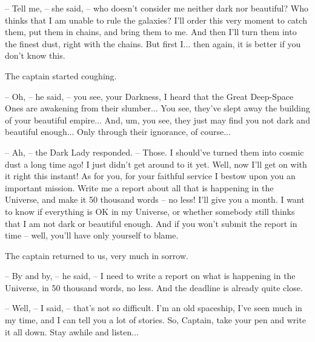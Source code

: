 \documentclass[ebook,oneside,final,openright]{memoir}
\begin{document}
– Tell me, – she said, – who doesn’t consider me neither dark nor beautiful? Who thinks that I am unable to rule the galaxies? I’ll order this very moment to catch them, put them in chains, and bring them to me. And then I’ll turn them into the finest dust, right with the chains. But first I... then again, it is better if you don’t know this.\par
The captain started coughing.\par
– Oh, – he said, – you see, your Darkness, I heard that the Great Deep-Space Ones are awakening from their slumber... You see, they’ve slept away the building of your beautiful empire... And, um, you see, they just may find you not dark and beautiful enough... Only through their ignorance, of course...\par
– Ah, – the Dark Lady responded. – Those. I should’ve turned them into cosmic dust a long time ago! I just didn’t get around to it yet. Well, now I’ll get on with it right this instant! As for you, for your faithful service I bestow upon you an important mission. Write me a report about all that is happening in the Universe, and make it 50 thousand words – no less! I’ll give you a month. I want to know if everything is OK in my Universe, or whether somebody still thinks that I am not dark or beautiful enough. And if you won’t submit the report in time – well, you’ll have only yourself to blame.\par
\par
The captain returned to us, very much in sorrow.\par
– By and by, – he said, – I need to write a report on what is happening in the Universe, in 50 thousand words, no less. And the deadline is already quite close.\par
– Well, – I said, – that’s not so difficult. I’m an old spaceship, I’ve seen much in my time, and I can tell you a lot of stories. So, Captain, take your pen and write it all down. Stay awhile and listen...
\end{document}

